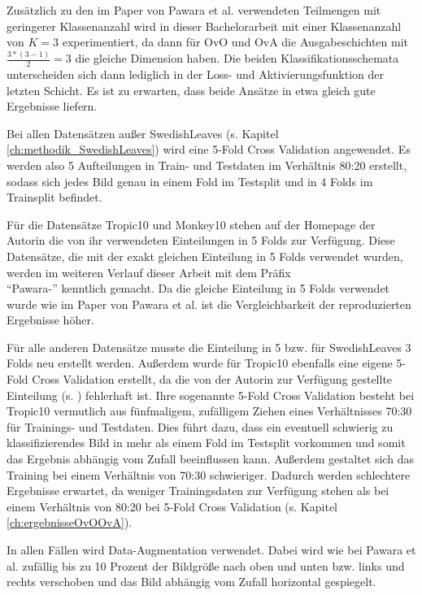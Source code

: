 Zusätzlich zu den im Paper von Pawara et al. \cite{pawaraPaper} verwendeten Teilmengen mit geringerer Klassenanzahl wird in dieser Bachelorarbeit mit einer Klassenanzahl von $K=3$ experimentiert, da dann für OvO und OvA die Ausgabeschichten mit $\frac{3*(3-1)}{2} = 3$ die gleiche Dimension haben. Die beiden Klassifikationsschemata unterscheiden sich dann lediglich in der Loss- und Aktivierungsfunktion der letzten Schicht. Es ist zu erwarten, dass beide Ansätze in etwa gleich gute Ergebnisse liefern.

Bei allen Datensätzen außer SwedishLeaves (s. Kapitel \ref{ch:methodik_SwedishLeaves}) wird eine 5-Fold Cross Validation angewendet. Es werden also 5 Aufteilungen in Train- und Testdaten im Verhältnis 80:20 erstellt, sodass sich jedes Bild genau in einem Fold im Testsplit und in 4 Folds im Trainsplit befindet.

Für die Datensätze Tropic10 und Monkey10 stehen auf der Homepage der Autorin \cite{pawaraWebsiteDatensaetze} die von ihr verwendeten Einteilungen in 5 Folds zur Verfügung. Diese Datensätze, die mit der exakt gleichen Einteilung in 5 Folds verwendet wurden, werden im weiteren Verlauf dieser Arbeit mit dem Präfix\\ \enquote{Pawara-} kenntlich gemacht. Da die gleiche Einteilung in 5 Folds verwendet wurde wie im Paper von Pawara et al. \cite{pawaraPaper} ist die Vergleichbarkeit der reproduzierten Ergebnisse höher.

Für alle anderen Datensätze musste die Einteilung in 5 bzw. für SwedishLeaves 3 Folds neu erstellt werden.
Außerdem wurde für Tropic10 ebenfalls eine eigene 5-Fold Cross Validation erstellt, da die von der Autorin zur Verfügung gestellte Einteilung (s. \cite{pawaraWebsiteDatensaetze}) fehlerhaft ist. Ihre sogenannte 5-Fold Cross Validation besteht bei Tropic10 vermutlich aus fünfmaligem, zufälligem Ziehen eines Verhältnisses 70:30 für Trainings- und Testdaten. Dies führt dazu, dass ein eventuell schwierig zu klassifizierendes Bild in mehr als einem Fold im Testsplit vorkommen und somit das Ergebnis abhängig vom Zufall beeinflussen kann. Außerdem gestaltet sich das Training bei einem Verhältnis von 70:30 schwieriger. Dadurch werden schlechtere Ergebnisse erwartet, da weniger Trainingsdaten zur Verfügung stehen als bei einem Verhältnis von 80:20 bei 5-Fold Cross Validation (s. Kapitel \ref{ch:ergebnisseOvOOvA}).


In allen Fällen wird Data-Augmentation verwendet. Dabei wird wie bei Pawara et al. \cite{pawaraPaper, pawaraWebsiteCode} zufällig bis zu 10 Prozent der Bildgröße nach oben und unten bzw. links und rechts verschoben und das Bild abhängig vom Zufall horizontal gespiegelt.

